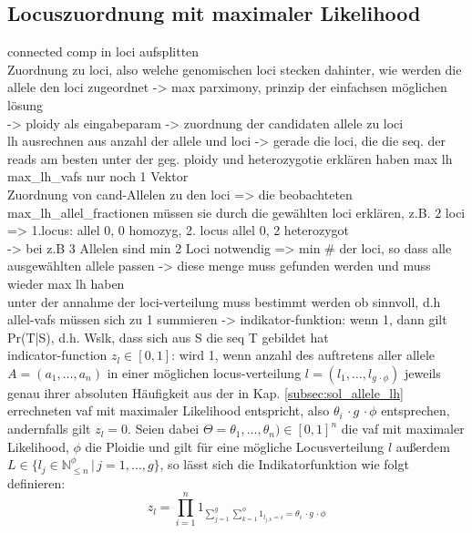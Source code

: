 \subsection{Locuszuordnung mit maximaler Likelihood} \label{subsec:sol_loci_lh}
connected comp in loci aufsplitten\\
Zuordnung zu loci, also welche genomischen loci stecken dahinter, wie werden die allele den loci zugeordnet -> max parximony, prinzip der einfachsen möglichen lösung \\
-> ploidy als eingabeparam -> zuordnung der candidaten allele zu loci\\
lh ausrechnen aus anzahl der allele und loci -> gerade die loci, die die seq. der reads am besten unter der geg. ploidy und heterozygotie erklären haben max lh
max\_lh\_vafs nur noch 1 Vektor\\
Zuordnung von cand-Allelen zu den loci => die beobachteten max\_lh\_allel\_fractionen müssen sie durch die gewählten loci erklären, z.B. 2 loci => 1.locus: allel 0, 0 homozyg, 2. locus allel 0, 2 heterozygot\\
-> bei z.B 3 Allelen sind min 2 Loci notwendig => min \# der loci, so dass alle ausgewählten allele passen -> diese menge muss gefunden werden und muss wieder max lh haben\\
unter der annahme der loci-verteilung muss bestimmt werden ob sinnvoll, d.h allel-vafs müssen sich zu 1 summieren -> indikator-funktion: wenn 1, dann gilt Pr(T|S), d.h. Wslk, dass sich aus S die seq T gebildet hat\\

indicator-function $z_{l} \in {[0,1]}$: wird 1, wenn anzahl des auftretens aller allele $A = (a_{1}, \dots, a_{n})$ in einer möglichen locus-verteilung $l = (l_{1}, \dots, l_{g \, \cdotp \phi})$ jeweils genau ihrer absoluten Häufigkeit aus der in Kap. \ref{subsec:sol_allele_lh} errechneten vaf mit maximaler Likelihood entspricht, also $\theta_{i} \, \cdotp g \, \cdotp \phi$ entsprechen, andernfalls gilt $ z_{l} = 0 $. Seien dabei  $\Theta=\theta_{1},\dots,\theta_{n}) \in [0,1]^n $ die vaf mit maximaler Likelihood, $ \phi $ die Ploidie und gilt für eine mögliche Locusverteilung $l$ außerdem $L \in \{l_{j} \in \mathds{N}_{\leq n}^\phi \, | \, j=1, \dots, g\}$, so lässt sich die Indikatorfunktion wie folgt definieren:
\begin{equation} \label{eqn:2-19}
\tag{2-19}
z_{l}=\prod_{i=1}^{n}1_{\sum_{j=1}^{g}\sum_{k=1}^{\phi}1_{l_{j,k}=i} = \theta_{i} \, \cdotp g \, \cdotp \phi}
\end{equation}

